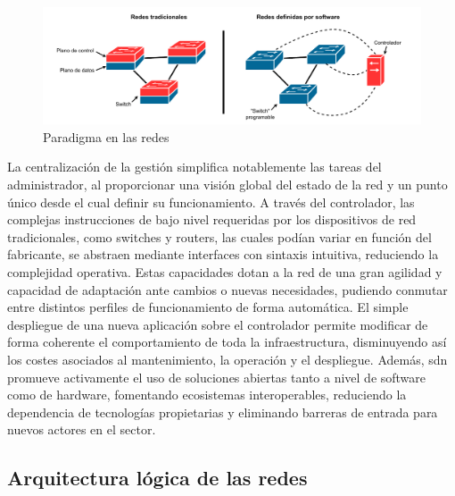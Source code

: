 \begin{figure}[ht!]
\centering
\includegraphics[width=\textwidth]{fig/02_sota/sota_1_sdn_idea.drawio.pdf}
\caption{Paradigma en las redes }
\label{fig:sdn_paradigma}
\end{figure}

La centralización de la gestión simplifica notablemente las tareas del administrador, al proporcionar una visión global del estado de la red y un punto único desde el cual definir su funcionamiento. A través del controlador, las complejas instrucciones de bajo nivel requeridas por los dispositivos de red tradicionales, como switches y routers, las cuales podían variar en función del fabricante, se abstraen mediante interfaces con sintaxis intuitiva, reduciendo la complejidad operativa. Estas capacidades dotan a la red de una gran agilidad y capacidad de adaptación ante cambios o nuevas necesidades, pudiendo conmutar entre distintos perfiles de funcionamiento de forma automática. El simple despliegue de una nueva aplicación sobre el controlador permite modificar de forma coherente el comportamiento de toda la infraestructura, disminuyendo así los costes asociados al mantenimiento, la operación y el despliegue. Además, \gls{sdn} promueve activamente el uso de soluciones abiertas tanto a nivel de software como de hardware, fomentando ecosistemas interoperables, reduciendo la dependencia de tecnologías propietarias y eliminando barreras de entrada para nuevos actores en el sector.

\subsection{Arquitectura lógica de las redes }
\label{subsec:arquitectura_sdn}

